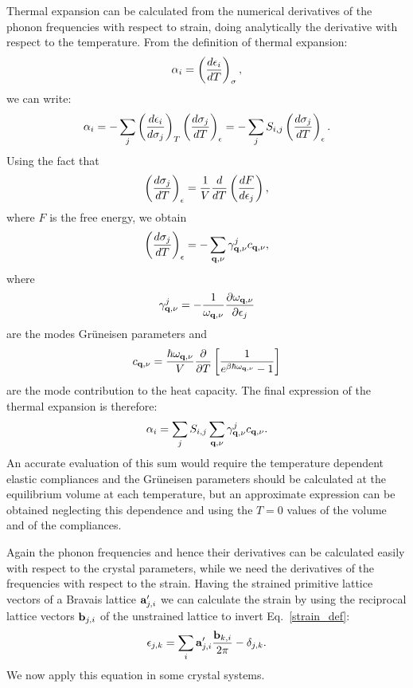 \documentclass[12pt,a4paper,twoside]{report}
\begin{document}
Thermal expansion can be calculated from the numerical derivatives of the 
phonon frequencies with respect to strain, doing analytically the
derivative with respect to the temperature.
From the definition of thermal expansion:
\begin{equation}
\alpha_i= \left( {d \epsilon_i \over d T}\right)_{\sigma},
\end{equation}
we can write:
\begin{equation}
\alpha_i= - \sum_j \left({d \epsilon_i \over d \sigma_j}\right)_{T} 
\left({d \sigma_j \over d T} \right)_{\epsilon} = - \sum_j S_{i,j}
\left({d \sigma_j \over d T} \right)_{\epsilon}.
\end{equation}
Using the fact that 
\begin{equation}
\left({d \sigma_j \over d T} \right)_{\epsilon} = {1\over V} {d \over d T} \left( {d F \over d \epsilon_j}\right),
\end{equation}
where $F$ is the free energy, we obtain 
\begin{equation}
\left({d \sigma_j \over d T} \right)_{\epsilon} = -\sum_{{\bf q},\nu}
\gamma_{{\bf q},\nu}^j c_{{\bf q},\nu},
\end{equation}
where
\begin{equation}
\gamma_{{\bf q},\nu}^j = -{1\over \omega_{{\bf q},\nu}} {\partial
\omega_{{\bf q},\nu} \over \partial \epsilon_j} 
\end{equation}
are the modes Gr\"uneisen parameters and 
\begin{equation}
c_{{\bf q},\nu} = {\hbar \omega_{{\bf q},\nu} \over V} {\partial
\over \partial T } \left[{1 \over e^{\beta \hbar \omega_{{\bf q},\nu}} - 1}
\right]
\end{equation}
are the mode contribution to the heat capacity.
The final expression of the thermal expansion is therefore:
\begin{equation}
\alpha_i = \sum_j S_{i,j} \sum_{{\bf q},\nu}
\gamma_{{\bf q},\nu}^j c_{{\bf q},\nu}.
\end{equation}
An accurate evaluation of this sum would require the temperature dependent
elastic compliances and the Gr\"uneisen parameters should be calculated
at the equilibrium volume at each temperature, but an approximate expression 
can be obtained neglecting this dependence and using the $T=0$ values
of the volume and of the compliances. 

Again the phonon frequencies and hence their derivatives can be calculated 
easily with respect to the crystal parameters, while we need the derivatives 
of the frequencies with respect to the strain. 
Having the strained primitive lattice vectors of a Bravais lattice 
${\bf a}'_{j,i}$ we can calculate the strain by using the reciprocal 
lattice vectors ${\bf b}_{j,i}$ of the unstrained lattice to invert
Eq.~\ref{strain_def}:
\begin{equation}
\epsilon_{j,k} = \sum_i {\bf a}'_{j,i} {{\bf b}_{k,i} \over 2 \pi} -
\delta_{j,k}.
\label{strain}
\end{equation}
We now apply this equation in some crystal systems.
\end{document}
